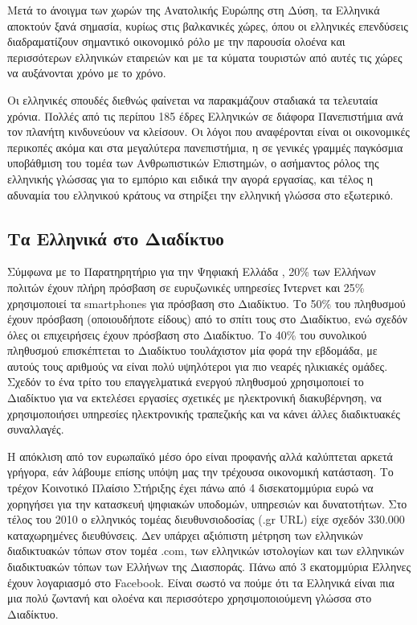 \begin{multicols}{2}
Μετά το άνοιγμα των χωρών της Ανατολικής Ευρώπης στη Δύση, τα Ελληνικά αποκτούν ξανά σημασία, κυρίως στις βαλκανικές χώρες, όπου οι ελληνικές επενδύσεις διαδραματίζουν σημαντικό οικονομικό ρόλο με την παρουσία ολοένα και περισσότερων ελληνικών εταιρειών και με τα κύματα τουριστών από αυτές τις χώρες να αυξάνονται χρόνο με το χρόνο.

Οι ελληνικές σπουδές διεθνώς φαίνεται να παρακμάζουν σταδιακά τα τελευταία χρόνια. Πολλές από τις περίπου 185 έδρες Ελληνικών σε διάφορα Πανεπιστήμια ανά τον πλανήτη κινδυνεύουν να κλείσουν. Οι λόγοι που αναφέρονται είναι οι οικονομικές περικοπές ακόμα και στα μεγαλύτερα πανεπιστήμια, η σε γενικές γραμμές παγκόσμια υποβάθμιση του τομέα των Ανθρωπιστικών Επιστημών, ο ασήμαντος ρόλος της ελληνικής γλώσσας για το εμπόριο και ειδικά την αγορά εργασίας, και τέλος η αδυναμία του ελληνικού κράτους να στηρίξει την ελληνική γλώσσα στο εξωτερικό.

\subsection{Τα Ελληνικά στο Διαδίκτυο}

Σύμφωνα με το Παρατηρητήριο για την Ψηφιακή Ελλάδα \cite{Obs1}, 20\% των Ελλήνων πολιτών έχουν πλήρη πρόσβαση σε ευρυζωνικές υπηρεσίες Ίντερνετ και 25\% χρησιμοποιεί τα smartphones για πρόσβαση στο Διαδίκτυο. Το 50\% του πληθυσμού έχουν πρόσβαση (οποιουδήποτε είδους) από το σπίτι τους στο Διαδίκτυο, ενώ σχεδόν όλες οι επιχειρήσεις έχουν πρόσβαση στο Διαδίκτυο. Το 40\% του συνολικού πληθυσμού  επισκέπτεται το Διαδίκτυο τουλάχιστον μία φορά την εβδομάδα, με αυτούς τους αριθμούς να είναι πολύ υψηλότεροι για πιο νεαρές ηλικιακές ομάδες. Σχεδόν το ένα τρίτο του επαγγελματικά ενεργού πληθυσμού χρησιμοποιεί το Διαδίκτυο για να εκτελέσει εργασίες σχετικές με ηλεκτρονική διακυβέρνηση, να χρησιμοποιήσει υπηρεσίες ηλεκτρονικής τραπεζικής και να κάνει άλλες διαδικτυακές συναλλαγές.

Η απόκλιση από τον ευρωπαϊκό μέσο όρο είναι προφανής αλλά καλύπτεται αρκετά γρήγορα, εάν λάβουμε επίσης υπόψη μας την τρέχουσα οικονομική κατάσταση. Το τρέχον Κοινοτικό Πλαίσιο Στήριξης έχει πάνω από 4 δισεκατομμύρια ευρώ να χορηγήσει για την κατασκευή ψηφιακών υποδομών, υπηρεσιών και δυνατοτήτων.
Στο τέλος του 2010 ο ελληνικός τομέας διευθυνσιοδοσίας (.gr URL) είχε σχεδόν 330.000 καταχωρημένες διευθύνσεις. Δεν υπάρχει αξιόπιστη μέτρηση των ελληνικών διαδικτυακών τόπων στον τομέα .com, των ελληνικών ιστολογίων και των ελληνικών διαδικτυακών τόπων των Ελλήνων της Διασποράς. Πάνω από 3 εκατομμύρια Έλληνες έχουν λογαριασμό στο Facebook. Είναι σωστό να πούμε ότι τα Ελληνικά είναι πια μια πολύ ζωντανή και ολοένα και περισσότερο χρησιμοποιούμενη γλώσσα στο Διαδίκτυο.


\end{multicols}

